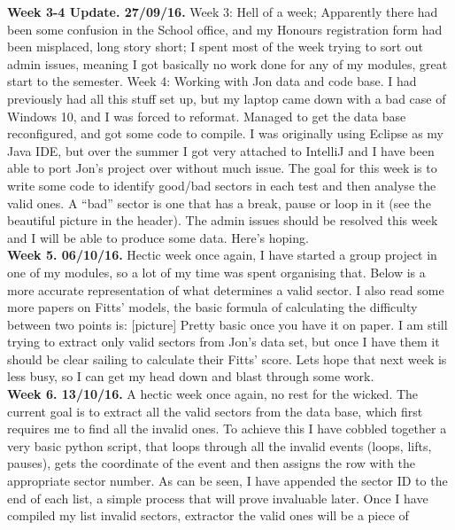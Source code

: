 \begin{appendices}
		\textbf{Week 3-4 Update. 27/09/16.}
		Week 3:
		Hell of a week; Apparently there had been some confusion in the School office, and my Honours registration form had been misplaced, long story short; I spent most of the week trying to sort out admin issues, meaning I got basically no work done for any of my modules, great start to the semester.
		Week 4:
		Working with Jon data and code base. I had previously had all this stuff set up, but my laptop came down with a bad case of Windows 10, and I was forced to reformat. Managed to get the data base reconfigured, and got some code to compile.
		I was originally using Eclipse as my Java IDE, but over the summer I got very attached to IntelliJ and I have been able to port Jon’s project over without much issue.
		The goal for this week is to write some code to identify good/bad sectors in each test and then analyse the valid ones.
		A “bad” sector is one that has a break, pause or loop in it (see the beautiful picture in the header).
		The admin issues should be resolved this week and I will be able to produce some data.
		Here’s hoping.\\
		
		\textbf{Week 5. 06/10/16.}
		Hectic week once again, I have started a group project in one of my modules, so a lot of my time was spent organising that.
		Below is a more accurate representation of what determines a valid sector.
		I also read some more papers on Fitts’ models, the basic formula of calculating the difficulty between two points is: [picture]
		Pretty basic once you have it on paper.
		I am still trying to extract only valid sectors from Jon’s data set, but once I have them it should be clear sailing to calculate their Fitts’ score.
		Lets hope that next week is less busy, so I can get my head down and blast through some work.\\
		
		\textbf{Week 6. 13/10/16.}
		A hectic week once again, no rest for the wicked.
		The current goal is to extract all the valid sectors from the data base, which first requires me to find all the invalid ones. To achieve this I have cobbled together a very basic python script, that loops through all the invalid events (loops, lifts, pauses), gets the coordinate of the event and then assigns the row with the appropriate sector number.
		As can be seen, I have appended the sector ID to the end of each list, a simple process that will prove invaluable later.
		Once I have compiled my list invalid sectors, extractor the valid ones will be a piece of\\
		

\end{appendices}
